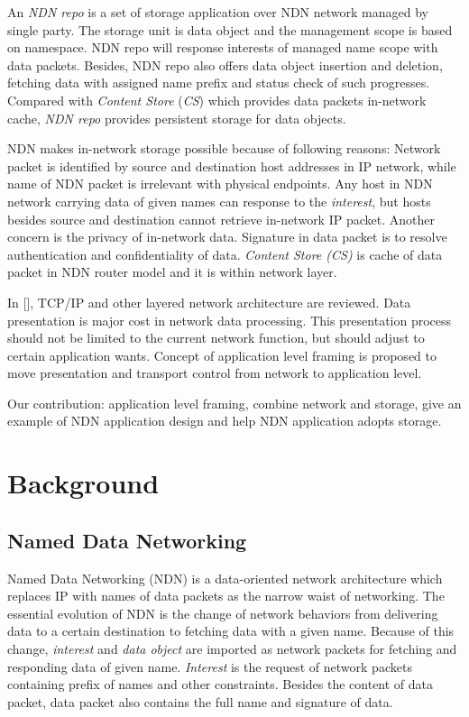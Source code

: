 \documentclass[conference]{IEEEtran}
\begin{document}
An \emph{NDN repo} is a set of storage application over NDN network managed by single party. The storage unit is data object and the management scope is based on namespace. NDN repo will response interests of managed name scope with data packets. Besides, NDN repo also offers data object insertion and deletion, fetching data with assigned name prefix and status check of such progresses. Compared with \emph{Content Store} (\emph{CS}) which provides data packets in-network cache, \emph{NDN repo} provides persistent storage for data objects.

NDN makes in-network storage possible because of following reasons: Network packet is identified by source and destination host addresses in IP network, while name of NDN packet is irrelevant with physical endpoints. Any host in NDN network carrying data of given names can response to the \emph{interest}, but hosts besides source and destination cannot retrieve in-network IP packet. Another concern is the privacy of in-network data. Signature in data packet is to resolve authentication and confidentiality of data. \emph{Content Store (CS)} is cache of data packet in NDN router model and it is within network layer.

In [], TCP/IP and other layered network architecture are reviewed. Data presentation is major cost in network data processing. This presentation process should not be limited to the current network function, but should adjust to certain application wants. Concept of application level framing is proposed to move presentation and transport control from network to application level.

Our contribution: application level framing, combine network and storage, give an example of NDN application design and help NDN application adopts storage.

\section{Background}
\subsection{Named Data Networking}
Named Data Networking (NDN) \cite{zhang2010named} is a data-oriented network architecture which replaces IP with names of data packets as the narrow waist of networking. The essential evolution of NDN is the change of network behaviors from delivering data to a certain destination to fetching data with a given name. \cite{zhang2010named} Because of this change, \emph{interest} and \emph{data object} are imported as network packets for fetching and responding data of given name. \emph{Interest} is the request of network packets containing prefix of names and other constraints. Besides the content of data packet, data packet also contains the full name and signature of data.
\end{document}
